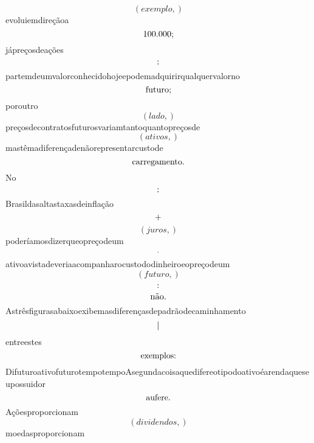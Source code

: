 \documentclass{article}
\begin{document}
\begin{equation}
\left( exemplo,\right)
\end{equation}evoluiemdireçãoa\begin{equation}
$100.000;$
\end{equation}jápreçosdeações\begin{equation}
$:$
\end{equation}partemdeumvalorconhecidohojeepodemadquirirqualquervalorno\begin{equation}
$futuro;$
\end{equation}poroutro\begin{equation}
\left( lado,\right)
\end{equation}preçosdecontratosfuturosvariamtantoquantopreçosde\begin{equation}
\left( ativos,\right)
\end{equation}mastêmadiferençadenãorepresentarcustode\begin{equation}
$carregamento.$
\end{equation}No\begin{equation}
$:$
\end{equation}Brasildasaltastaxasdeinflação\begin{equation}
$+$
\end{equation}\begin{equation}
\left( juros,\right)
\end{equation}poderíamosdizerqueopreçodeum\begin{equation}
$.$
\end{equation}ativoavistadeveriaacompanharocustododinheiroeopreçodeum\begin{equation}
\left( futuro,\right)
\end{equation}\begin{equation}
$:$
\end{equation}\begin{equation}
$não.$
\end{equation}Astrêsfigurasabaixoexibemasdiferençasdepadrãodecaminhamento\begin{equation}
$|$
\end{equation}entreestes\begin{equation}
$exemplos:$
\end{equation}DifuturoativofuturotempotempoAsegundacoisaquedifereotipodoativoéarendaqueseupossuidor\begin{equation}
$aufere.$
\end{equation}Açõesproporcionam\begin{equation}
\left( dividendos,\right)
\end{equation}moedasproporcionam\begin{equation}

\end{equation}
\end{document}
